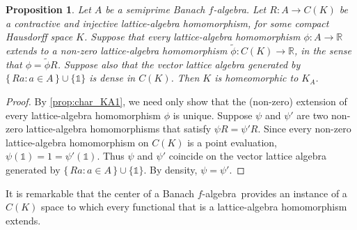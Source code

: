 \documentclass{memo-l}
\newtheorem{prop}[theorem]{Proposition}
\theoremstyle{definition}
\theoremstyle{remark}
\numberwithin{section}{chapter}
\numberwithin{equation}{chapter}
\newcommand\R{\ensuremath{\mathbb{R}}}
\newcommand{\one}{\ensuremath{\mathbb{1}}}
\newcommand{\falg}{$f\!$-algebra}
\begin{document}
\begin{prop}\label{prop:char_KA2}
    Let $A$ be a semiprime Banach \falg. Let $R\colon A\to C(K)$ be a
    contractive and injective lattice-algebra homomorphism, for some
    compact Hausdorff space $K$. Suppose that every lattice-algebra
    homomorphism $\phi \colon A\to \R$ extends to a non-zero
    lattice-algebra homomorphism $\tilde \phi \colon C(K)\to \R$, in
    the sense that $\phi =\tilde \phi R$. Suppose also that the vector
    lattice algebra generated by $\{\, Ra : a \in A \, \} \cup
    \{\one\}$ is dense in $C(K)$. Then $K$ is homeomorphic to $K_A$.
\end{prop}
\begin{proof}
    By \cref{prop:char_KA1}, we need only show that the (non-zero) extension
    of every lattice-algebra homomorphism $\phi $ is unique. Suppose
    $\psi $ and $\psi '$ are two non-zero lattice-algebra
    homomorphisms that satisfy $\psi R=\psi 'R$. Since every non-zero
    lattice-algebra homomorphism on $C(K)$ is a point evaluation,
    $\psi (\one)=1=\psi '(\one)$. Thus $\psi $ and $\psi '$ coincide
    on the vector lattice algebra generated by $\{\, Ra : a \in A \,
    \} \cup \{\one\}$. By density, $\psi =\psi '$.
\end{proof}

It is remarkable that the center of a Banach \falg\ provides
an instance of a $C(K)$ space to which every functional that is a
lattice-algebra homomorphism extends.
\end{document}
